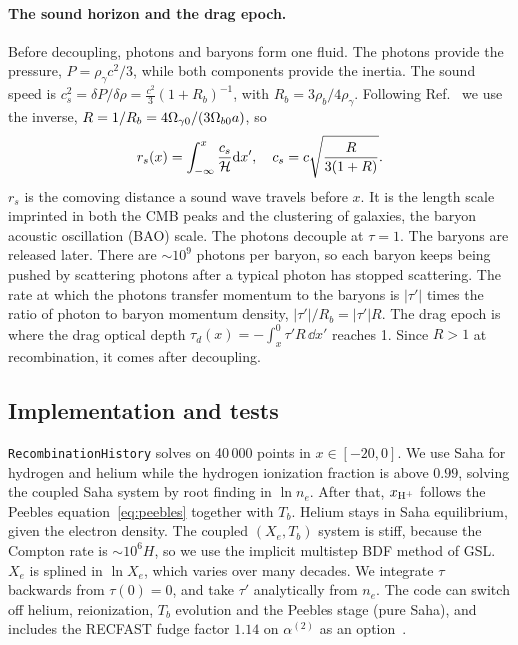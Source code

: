 \paragraph*{The sound horizon and the drag epoch.} Before decoupling, photons and baryons form one fluid. The photons
provide the pressure, $P=\rho_\gamma c^2/3$, while both components provide the inertia. The sound speed is
$c_s^2=\delta P/\delta\rho=\tfrac{c^2}{3}(1+R_b)^{-1}$, with $R_b=3\rho_b/4\rho_\gamma$. Following
Ref.~\cite{Callin2006} we use the inverse, $R=1/R_b=4\Omega_{\gamma0}/(3\Omega_{b0}a)$, so
\begin{equation}
r_s(x) = \int_{-\infty}^x\frac{c_s}{\mathcal{H}}\mathrm{d} x',\quad c_s=c\sqrt{\frac{R}{3(1+R)}}.
\end{equation}
$r_s$ is the comoving distance a sound wave travels before $x$. It is the length scale imprinted in both the CMB
peaks and the clustering of galaxies, the baryon acoustic oscillation (BAO) scale. The photons decouple at $\tau=1$.
The baryons are released later. There are $\sim10^9$ photons per baryon, so each baryon keeps being pushed by
scattering photons after a typical photon has stopped scattering. The rate at which the photons transfer momentum to
the baryons is $|\tau'|$ times the ratio of photon to baryon momentum density, $|\tau'|/R_b=|\tau'|R$. The drag epoch is
where the drag optical depth $\tau_d(x)=-\int_x^0\tau'R\,\dd x'$ reaches 1. Since $R>1$ at recombination, it comes
after decoupling.

\subsection{Implementation and tests}

\texttt{RecombinationHistory} solves on 40\,000 points in $x\in[-20,0]$. We use Saha for hydrogen and helium while the
hydrogen ionization fraction is above $0.99$, solving the coupled Saha system by root finding in $\ln n_e$. After that,
$x_{\rm H^+}$ follows the Peebles equation~\eqref{eq:peebles} together with $T_b$. Helium stays in Saha equilibrium, given
the electron density. The coupled $(X_e,T_b)$ system is stiff, because the Compton rate is $\sim10^6H$, so we use the
implicit multistep BDF method of GSL. $X_e$ is splined in $\ln X_e$, which varies over many decades. We integrate
$\tau$ backwards from $\tau(0)=0$, and take $\tau'$ analytically from $n_e$. The code can switch off helium,
reionization, $T_b$ evolution and the Peebles stage (pure Saha), and includes the RECFAST fudge factor $1.14$ on
$\alpha^{(2)}$ as an option~\cite{Seager1999}.

